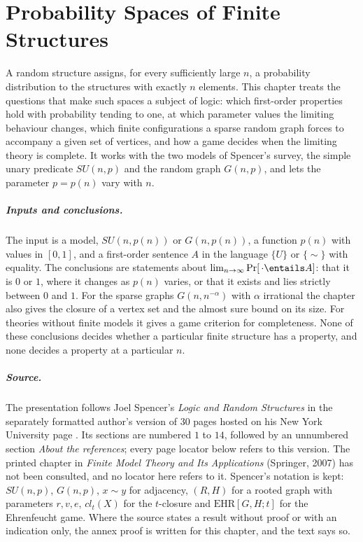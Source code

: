 \chapter{Probability Spaces of Finite Structures}
\label{sec:p03-w03-p03-064-probability-spaces}

A random structure assigns, for every sufficiently large \(n\), a probability
distribution to the structures with exactly \(n\) elements.  This chapter
treats the questions that make such spaces a subject of logic: which
first-order properties hold with probability tending to one, at which
parameter values the limiting behaviour changes, which finite configurations
a sparse random graph forces to accompany a given set of vertices, and how a
game decides when the limiting theory is complete.  It works with the two
models of Spencer's survey, the simple unary predicate \(SU(n,p)\) and the
random graph \(G(n,p)\), and lets the parameter \(p=p(n)\) vary with \(n\).

\paragraph{Inputs and conclusions.}
The input is a model, \(SU(n,p(n))\) or \(G(n,p(n))\), a function \(p(n)\)
with values in \([0,1]\), and a first-order sentence \(A\) in the language
\(\{U\}\) or \(\{\sim\}\) with equality.  The conclusions are statements
about \(\lim_{n\to\infty}\Pr[\,\cdot\entails A]\): that it is \(0\) or \(1\),
where it changes as \(p(n)\) varies, or that it exists and lies strictly
between \(0\) and \(1\).  For the sparse graphs \(G(n,n^{-\alpha})\) with
\(\alpha\) irrational the chapter also gives the closure of a vertex set and
the almost sure bound on its size.  For theories without finite models it
gives a game criterion for completeness.  None of these conclusions decides
whether a particular finite structure has a property, and none decides a
property at a particular \(n\).

\paragraph{Source.}
The presentation follows Joel Spencer's \emph{Logic and Random Structures}
in the separately formatted author's version of 30 pages hosted on his New
York University page \cite{Spencer2007LogicRandomStructuresAuthor}.  Its
sections are numbered \(1\) to \(14\), followed by an unnumbered section
\emph{About the references}; every page locator below refers to this
version.  The printed chapter in \emph{Finite Model Theory and Its
Applications} (Springer, 2007) has not been consulted, and no locator here
refers to it.  Spencer's notation is kept: \(SU(n,p)\), \(G(n,p)\),
\(x\sim y\) for adjacency, \((R,H)\) for a rooted graph with parameters
\(r,v,e\), \(cl_t(X)\) for the \(t\)-closure and \(\mathrm{EHR}[G,H;t]\) for
the Ehrenfeucht game.  Where the source states a result without proof or with
an indication only, the annex proof is written for this chapter, and the
text says so.

